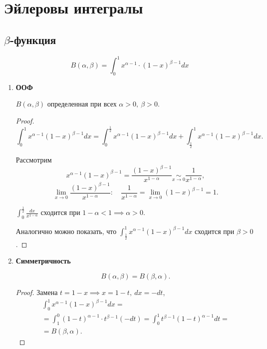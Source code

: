 \newpage

\section{Эйлеровы интегралы}

\subsection{$ \beta $-функция}

\[
    \boxed{B(\alpha,\beta) = \int_{0}^{1}x^{\alpha - 1}\cdot (1-x)^{\beta-1}dx}
\]

\begin{enumerate}
    \item \textbf{ООФ}

          \begin{statement}
              $ B(\alpha,\beta) $ определенная при всех $ \alpha > 0, \ \beta > 0 $.
          \end{statement}

          \begin{proof}
              \[
                  \int_{0}^{1}x^{\alpha-1}(1-x)^{\beta-1}dx = \int_{0}^{\frac{1}{2}}x^{\alpha-1}(1-x)^{\beta-1}dx + \int_{\frac{1}{2}}^{1}x^{\alpha-1}(1-x)^{\beta-1}dx.
              \]

              Рассмотрим
              \[
                  x^{\alpha-1}(1-x)^{\beta-1} = \frac{(1-x)^{\beta-1}}{x^{1-\alpha}} \underset{x \rightarrow 0}{\sim} \frac{1}{x^{1-\alpha}},
              \]
              \[
                  \underset{x \rightarrow 0}{\lim}\frac{(1-x)^{\beta-1}}{x^{1-\alpha}}: \quad \frac{1}{x^{1-\alpha}} = \underset{x \rightarrow 0}{\lim}(1-x)^{\beta -1} = 1.
              \]

              $ \int_{0}^{\frac{1}{2}}\frac{dx}{x^{1-\alpha}} $ сходится при $ 1 - \alpha < 1 \implies \alpha > 0 $.

              Аналогично можно показать, что $ \int_{\frac{1}{2}}^{1}x^{\alpha-1}(1-x)^{\beta-1}dx $ сходится при $ \beta > 0 $.
          \end{proof}

    \item \textbf{Симметричность}

          \begin{statement}
              \[
                  B(\alpha,\beta) = B(\beta,\alpha).
              \]
          \end{statement}

          \begin{proof}
              Замена $ t = 1 - x \implies x = 1 - t, \ dx = -dt $,
              \begin{multline*}
                  \int_{0}^{1}x^{\alpha-1}(1-x)^{\beta-1}dx = \\
                  = \int_{1}^{0}(1-t)^{\alpha-1} \cdot t^{\beta-1}(-dt) = \int_{0}^{1}t^{\beta-1}(1-t)^{\alpha-1}dt = \\
                  = B(\beta,\alpha).
              \end{multline*}
          \end{proof}


\end{enumerate}

